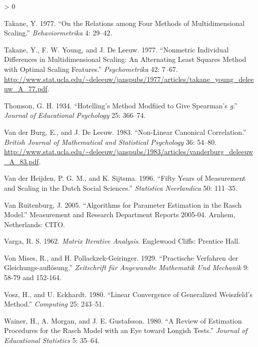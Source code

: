 \documentclass[
  12pt,
]{book}
\newlength{\cslhangindent}
\newenvironment{CSLReferences}[2] %
 {%
  \setlength{\parindent}{0pt}
  \ifodd #1 \everypar{\setlength{\hangindent}{\cslhangindent}}\ignorespaces\fi
  \ifnum #2 > 0
  \setlength{\parskip}{#2\baselineskip}
  \fi
 }%
 {}
\begin{document}
\begin{CSLReferences}{1}{0}
\leavevmode\hypertarget{ref-takane_77}{}%
Takane, Y. 1977. {``{On the Relations among Four Methods of Multidimensional Scaling}.''} \emph{Behaviormetrika} 4: 29--42.

\leavevmode\hypertarget{ref-takane_young_deleeuw_A_77}{}%
Takane, Y., F. W. Young, and J. De Leeuw. 1977. {``Nonmetric Individual Differences in Multidimensional Scaling: An Alternating Least Squares Method with Optimal Scaling Features.''} \emph{Psychometrika} 42: 7--67. \url{http://www.stat.ucla.edu/~deleeuw/janspubs/1977/articles/takane_young_deleeuw_A_77.pdf}.

\leavevmode\hypertarget{ref-thomson_34}{}%
Thomson, G. H. 1934. {``{Hotelling's Method Modfiied to Give {S}pearman's \emph{g}}.''} \emph{Journal of Educational Psychology} 25: 366--74.

\leavevmode\hypertarget{ref-vanderburg_deleeuw_A_83}{}%
Van der Burg, E., and J. De Leeuw. 1983. {``Non-Linear Canonical Correlation.''} \emph{British Journal of Mathematical and Statistical Psychology} 36: 54--80. \url{http://www.stat.ucla.edu/~deleeuw/janspubs/1983/articles/vanderburg_deleeuw_A_83.pdf}.

\leavevmode\hypertarget{ref-vanderheijden_sijtsma_96}{}%
Van der Heijden, P. G. M., and K. Sijtsma. 1996. {``{Fifty Years of Measurement and Scaling in the Dutch Social Sciences}.''} \emph{Statistica Neerlandica} 50: 111--35.

\leavevmode\hypertarget{ref-vanruitenburg_05}{}%
Van Ruitenburg, J. 2005. {``{Algorithms for Parameter Estimation in the Rasch Model}.''} Measurement and Research Department Reports 2005-04. Arnhem, Netherlands: CITO.

\leavevmode\hypertarget{ref-varga_62}{}%
Varga, R. S. 1962. \emph{{Matrix Iterative Analysis}}. Englewood Cliffs: Prentice Hall.

\leavevmode\hypertarget{ref-vonmises_pollackzek-geiringer_29}{}%
Von Mises, R., and H. Pollackzek-Geiringer. 1929. {``{Practische Verfahren der Gleichungs-aufl{ö}sung}.''} \emph{Zeitschrift für Angewandte Mathematik Und Mechanik} 9: 58-79 and 152-164.

\leavevmode\hypertarget{ref-vosz_eckhardt_80}{}%
Vosz, H., and U. Eckhardt. 1980. {``{Linear Convergence of Generalized {W}eiszfeld's Method}.''} \emph{Computing} 25: 243--51.

\leavevmode\hypertarget{ref-wainer_morgan_gustafsson_80}{}%
Wainer, H., A. Morgan, and J. E. Gustafsson. 1980. {``{A Review of Estimation Procedures for the Rasch Model with an Eye toward Longish Tests}.''} \emph{Journal of Educational Statistics} 5: 35--64.


\end{CSLReferences}
\end{document}
